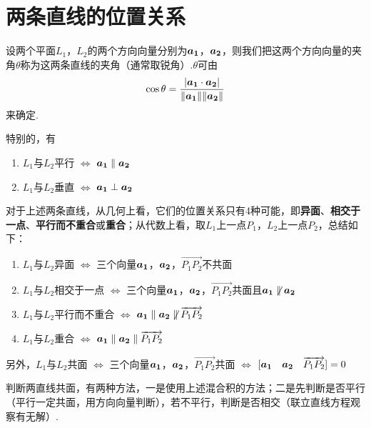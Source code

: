 \section{两条直线的位置关系}
\begin{definition}[两条直线的夹角]
  设两个平面$L_1$，$L_2$的两个方向向量分别为$\vb*{a_1}$，$\vb*{a_2}$，则我们把这两个方向向量的夹角$\theta$称为这两条直线的夹角（通常取锐角）.$\theta$可由
  \begin{equation*}
    \cos{\theta} =  \frac{|\vb*{a_1} \cdot \vb*{a_2}|}{\| \vb*{a_1} \|\| \vb*{a_2} \|}
  \end{equation*}
  来确定.
\end{definition}
\par 特别的，有
\begin{enumerate}
  \item $L_1$与$L_2$平行 $\Leftrightarrow$ $\vb*{a_1} \parallel \vb*{a_2}$
  \item $L_1$与$L_2$垂直 $\Leftrightarrow$ $\vb*{a_1} \perp \vb*{a_2}$
\end{enumerate}
\par 对于上述两条直线，从几何上看，它们的位置关系只有4种可能，即\textbf{异面}、\textbf{相交于一点}、\textbf{平行而不重合}或\textbf{重合}；从代数上看，取$L_1$上一点$P_1$，$L_2$上一点$P_2$，总结如下：
\begin{enumerate}
  \item $L_1$与$L_2$异面 $\Leftrightarrow$ 三个向量$\vb*{a_1}$，$\vb*{a_2}$，$\overrightarrow{P_1P_2}$不共面
  \item $L_1$与$L_2$相交于一点 $\Leftrightarrow$ 三个向量$\vb*{a_1}$，$\vb*{a_2}$，$\overrightarrow{P_1P_2}$共面且$\vb*{a_1} \not\parallel \vb*{a_2}$
  \item $L_1$与$L_2$平行而不重合 $\Leftrightarrow$ $\vb*{a_1} \parallel \vb*{a_2} \not\parallel \overrightarrow{P_1P_2}$
  \item $L_1$与$L_2$重合 $\Leftrightarrow$ $\vb*{a_1} \parallel \vb*{a_2} \parallel \overrightarrow{P_1P_2}$
\end{enumerate}
\par 另外，$L_1$与$L_2$共面 $\Leftrightarrow$ 三个向量$\vb*{a_1}$，$\vb*{a_2}$，$\overrightarrow{P_1P_2}$共面 $\Leftrightarrow$ $[\vb*{a_1} \quad \vb*{a_2} \quad \overrightarrow{P_1P_2}]=0$
\begin{remark}
  判断两直线共面，有两种方法，一是使用上述混合积的方法；二是先判断是否平行（平行一定共面，用方向向量判断），若不平行，判断是否相交（联立直线方程观察有无解）.
\end{remark}

